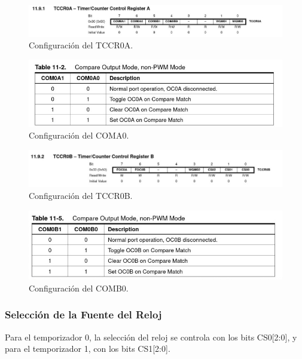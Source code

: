 \begin{figure}[H]
    \centering
    \includegraphics[scale=0.5]{images/TCCR0A_CL0.jpeg}
    \caption{Configuración del TCCR0A\cite{Atmel2011}.}
    \label{fig:enter-label}
\end{figure}
\begin{figure}[H]
    \centering
    \includegraphics[scale=0.5]{images/COM0A.jpeg}
    \caption{Configuración del COMA0\cite{Atmel2011}.}
    \label{fig:enter-label}
\end{figure}
\begin{figure}[H]
    \centering
    \includegraphics[scale=0.5]{images/TCCR0B.jpeg}
    \caption{Configuración del TCCR0B\cite{Atmel2011}.}
    \label{fig:enter-label}
\end{figure}
\begin{figure}[H]
    \centering
    \includegraphics[scale=0.5]{images/COMB0.jpeg}
    \caption{Configuración del COMB0\cite{Atmel2011}.}
    \label{fig:enter-label}
\end{figure}
\subsubsection{Selección de la Fuente del Reloj}
Para el temporizador 0, la selección del reloj se controla con los bits CS0[2:0], y para el temporizador 1, con los bits CS1[2:0].






